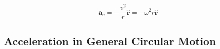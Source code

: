\begin{equation}
  \boxed{
    \bm a_c=-\frac{v^2}r\hat{\bm r}=-\omega^2r\hat{\bm r}
  }
  \label{eq:centripetal-acceleration}
\end{equation}



\subsection{Acceleration in General Circular Motion}

